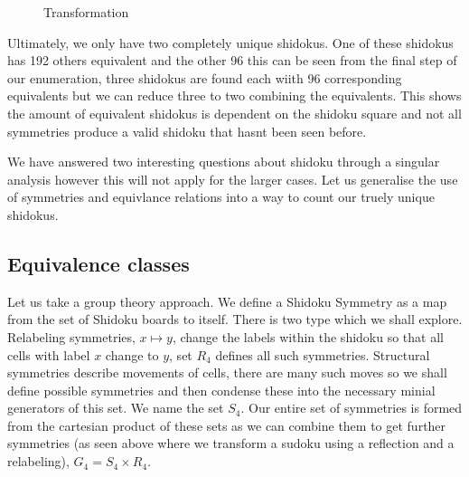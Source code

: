 \documentclass[a4paper,11pt]{report}
\newcounter{row}
\newcounter{col}
\newcounter{rowa}
\newcounter{cola}
\newcommand\setrowa[4]{
  \setcounter{cola}{1}
  \foreach \n in {#1, #2, #3, #4} {
    \edef\x{\value{cola} - 0.5}
    \edef\y{4.5 - \value{rowa}}
    \node[anchor=center] at (\x, \y) {\n};
    \stepcounter{cola}
  }
  \stepcounter{rowa}
}
\begin{document}
\begin{figure}[h]
\centering
{}
\caption{Transformation}
\label{fig:shidokutransformation}
\end{figure}

Ultimately, we only have two completely unique shidokus. One of these shidokus has 192 others equivalent and the other 96 this can be seen from the final step of our enumeration, three shidokus are found each wiith 96 corresponding equivalents but we can reduce three to two combining the equivalents. This shows the amount of equivalent shidokus is dependent on the shidoku square and not all symmetries produce a valid shidoku that hasnt been seen before.

We have answered two interesting questions about shidoku through a singular analysis however this will not apply for the larger cases. Let us generalise the use of symmetries and equivlance relations into a way to count our truely unique shidokus.

\subsection{Equivalence classes}
Let us take a group theory approach. We define a Shidoku Symmetry as a map from the set of Shidoku boards to itself. There is two type which we shall explore. Relabeling symmetries, $x\mapsto y$, change the labels within the shidoku so that all cells with label $x$ change to $y$, set $R_4$ defines all such symmetries. Structural symmetries describe movements of cells, there are many such moves so we shall define possible symmetries and then condense these into the necessary minial generators of this set. We name the set $S_4$. Our entire set of symmetries is formed from the cartesian product of these sets as we can combine them to get further symmetries (as seen above where we transform a sudoku using a reflection and a relabeling), $G_4=S_4\times R_4$.
\end{document}
